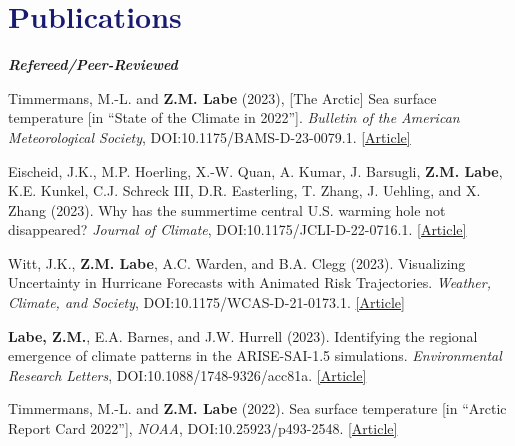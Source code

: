 \documentclass[margin,line,palatino,courier,10pt]{res}
\begin{document}
\begin{resume}
\vspace{-0.1in}
\noindent\textcolor{MidnightBlue}{\makebox[\linewidth][r]{\rule{\textwidth}{5pt}}}
\vspace{-0.3in}

\section{\sc \large{\textcolor{MidnightBlue}{\textbf{Publications}}}} 
\textit{\textbf{Refereed/Peer-Reviewed}}
\vspace*{-0.1in}\\
\begin{etaremune}[leftmargin=0in,topsep=0in,parsep=0in]
\item Timmermans, M.-L. and \textbf{Z.M. Labe} (2023), [The Arctic] Sea surface temperature [in ``State of the Climate in 2022'']. \textit{Bulletin of the American Meteorological Society}, DOI:10.1175/BAMS-D-23-0079.1. \href{https://doi.org/10.1175/BAMS-D-23-0079.1}{[Article]}
\item Eischeid, J.K., M.P. Hoerling, X.-W. Quan, A. Kumar, J. Barsugli, \textbf{Z.M. Labe}, K.E. Kunkel, C.J. Schreck III, D.R. Easterling, T. Zhang, J. Uehling, and X. Zhang (2023). Why has the summertime central U.S. warming hole not disappeared? \textit{Journal of Climate}, DOI:10.1175/JCLI-D-22-0716.1. \href{https://doi.org/10.1175/JCLI-D-22-0716.1}{[Article]}
\item Witt, J.K., \textbf{Z.M. Labe}, A.C. Warden, and B.A. Clegg (2023). Visualizing Uncertainty in Hurricane Forecasts with Animated Risk Trajectories. \textit{Weather, Climate, and Society}, DOI:10.1175/WCAS-D-21-0173.1. \href{https://journals.ametsoc.org/view/journals/wcas/aop/WCAS-D-21-0173.1/WCAS-D-21-0173.1.xml}{[Article]}
\item \textbf{Labe, Z.M.}, E.A. Barnes, and J.W. Hurrell (2023). Identifying the regional emergence of climate patterns in the ARISE-SAI-1.5 simulations. \textit{Environmental Research Letters}, DOI:10.1088/1748-9326/acc81a. \href{https://iopscience.iop.org/article/10.1088/1748-9326/acc81a}{[Article]}
\item Timmermans, M.-L. and \textbf{Z.M. Labe} (2022). Sea surface temperature [in ``Arctic Report Card 2022''], \textit{NOAA}, DOI:10.25923/p493-2548. \href{https://arctic.noaa.gov/Report-Card/Report-Card-2022/ArtMID/8054/ArticleID/988/Sea-Surface-Temperature}{[Article]}

\end{etaremune}
\end{resume}
\end{document}
